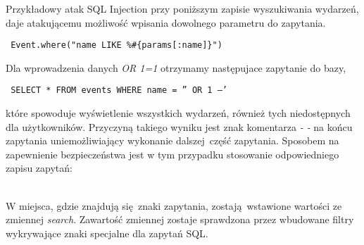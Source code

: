 Przykładowy atak SQL Injection przy poniższym zapisie wyszukiwania wydarzeń, daje atakującemu możliwość wpisania dowolnego parametru do zapytania.

\begin{center}
  \texttt{ Event.where("name LIKE \%\#\{params[:name]\}") }
\end{center}

Dla wprowadzenia danych \emph{OR 1=1} otrzymamy następujace zapytanie do bazy,

\begin{center}
  \texttt{ SELECT * FROM events WHERE name = '' OR 1 --' }
\end{center}

które spowoduje wyświetlenie wszystkich wydarzeń, również tych niedostępnych dla użytkowników. Przyczyną takiego wyniku jest znak komentarza \emph{- -} na końcu zapytania uniemożliwiający wykonanie dalszej część zapytania.
Sposobem na zapewnienie bezpieczeństwa jest w tym przypadku stosowanie odpowiedniego zapisu zapytań:

\begin{code}
  
\end{code}\\

W miejsca, gdzie znajdują się znaki zapytania, zostają wstawione wartości ze zmiennej \emph{search}. Zawartość zmiennej zostaje sprawdzona przez wbudowane filtry wykrywające znaki specjalne dla zapytań SQL.
